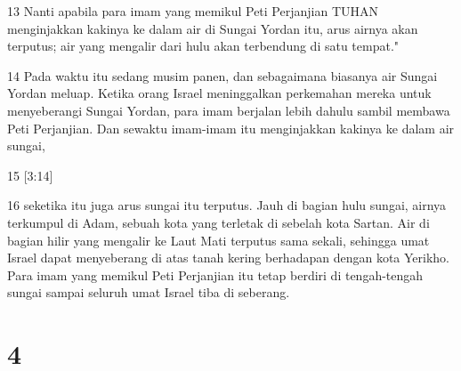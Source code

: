 \par 13 Nanti apabila para imam yang memikul Peti Perjanjian TUHAN menginjakkan kakinya ke dalam air di Sungai Yordan itu, arus airnya akan terputus; air yang mengalir dari hulu akan terbendung di satu tempat."
\par 14 Pada waktu itu sedang musim panen, dan sebagaimana biasanya air Sungai Yordan meluap. Ketika orang Israel meninggalkan perkemahan mereka untuk menyeberangi Sungai Yordan, para imam berjalan lebih dahulu sambil membawa Peti Perjanjian. Dan sewaktu imam-imam itu menginjakkan kakinya ke dalam air sungai,
\par 15 [3:14]
\par 16 seketika itu juga arus sungai itu terputus. Jauh di bagian hulu sungai, airnya terkumpul di Adam, sebuah kota yang terletak di sebelah kota Sartan. Air di bagian hilir yang mengalir ke Laut Mati terputus sama sekali, sehingga umat Israel dapat menyeberang di atas tanah kering berhadapan dengan kota Yerikho. Para imam yang memikul Peti Perjanjian itu tetap berdiri di tengah-tengah sungai sampai seluruh umat Israel tiba di seberang.

\chapter{4}

